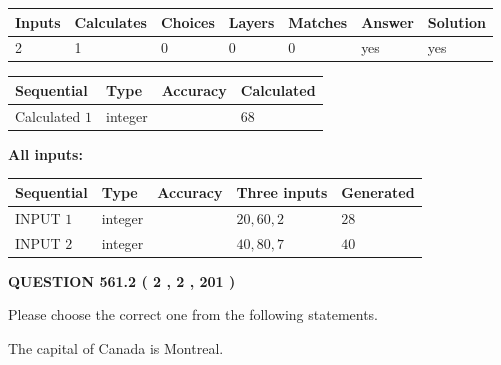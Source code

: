 \documentclass[12pt]{article}
\begin{document}
 

 
   
   
   
   
\noindent\begin{tabular}{|l|l|l|l|l|l|l|}
 \hline
Inputs & Calculates & Choices & Layers & Matches & Answer & Solution \\ \hline
 2  & 
 1  & 
 0
  & 
 0  & 
 0  & 
  yes & 
  yes 
  \\ \hline
 \end{tabular}
   
   
   
   
\noindent{}
   
   
  
  
\noindent\begin{tabular}{|l|l|l|l|}
\hline
 Sequential & Type & Accuracy & Calculated \\ 
\hline
 
 
  Calculated $  1 $ & integer &  & 
  $ 68 $ 
 \\  \hline  
 \end{tabular}
   
   
   
   
\noindent\vspace{0.1in}\hspace{-0.08in} {\textbf{\Large{All inputs: }}}
   
   
  
  
\noindent\begin{tabular}{|l|l|l|l|l|}
\hline
 Sequential & Type & Accuracy & Three inputs & Generated \\ 
\hline
 
 
  INPUT $  1 $ & integer &  & $
 20
 , 
 60
 , 
 2
 $ & $ 28 $ 
 \\  \hline  
 
 
  INPUT $  2 $ & integer &  & $
 40
 , 
 80
 , 
 7
 $ & $ 40 $ 
 \\  \hline  
 \end{tabular}
   
   
  
\vspace{0.2in}
  
{\textbf{\Large{QUESTION
561.2 
 ( 2 , 2 , 201 )
}}}
  
  
Please choose the correct one from the following statements.
 
 
The capital of Canada is Montreal.
 
\end{document}
